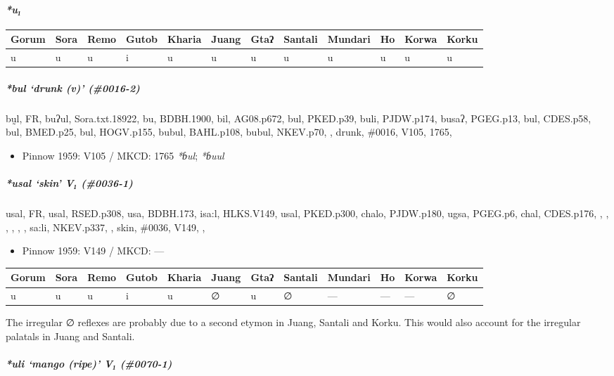\documentclass[a4paper,]{article}
\providecommand{\tightlist}{%
  \setlength{\itemsep}{0pt}\setlength{\parskip}{0pt}}
\let\oldparagraph\paragraph
\renewcommand{\paragraph}[1]{\oldparagraph{#1}\mbox{}}
\let\oldsubparagraph\subparagraph
\renewcommand{\subparagraph}[1]{\oldsubparagraph{#1}\mbox{}}
\begin{document}
\paragraph{\texorpdfstring{\emph{*u₁}}{*u₁}}\label{u}

\begin{longtable}[]{@{}llllllllllll@{}}
\toprule
Gorum & Sora & Remo & Gutob & Kharia & Juang & Gtaʔ & Santali & Mundari
& Ho & Korwa & Korku\tabularnewline
\midrule
\endhead
u & u & u & i & u & u & u & u & u & u & u & u\tabularnewline
\bottomrule
\end{longtable}

\subparagraph{\texorpdfstring{\emph{*bul} `drunk (v)'
(\#0016-2)}{*bul drunk (v) (\#0016-2)}}\label{bul-drunk-v-0016-2}

bṵl, FR, buʔul, Sora.txt.18922, bu, BDBH.1900, bil, AG08.p672, bul,
PKED.p39, buli, PJDW.p174, busaʔ, PGEG.p13, bul, CDES.p58, bul,
BMED.p25, bul, HOGV.p155, bubul, BAHL.p108, bubul, NKEV.p70, , drunk,
\#0016, V105, 1765,

\begin{itemize}
\tightlist
\item
  Pinnow 1959: V105 / MKCD: 1765 \emph{*ɓul}; \emph{*ɓuul}
\end{itemize}

\subparagraph{\texorpdfstring{\emph{*usal} `skin' V₁
(\#0036-1)}{*usal skin V₁ (\#0036-1)}}\label{usal-skin-v-0036-1}

usal, FR, usal, RSED.p308, usa, BDBH.173, isa:l, HLKS.V149, usal,
PKED.p300, chalo, PJDW.p180, ugsa, PGEG.p6, chal, CDES.p176, , , , , , ,
sa:li, NKEV.p337, , skin, \#0036, V149, ,

\begin{itemize}
\tightlist
\item
  Pinnow 1959: V149 / MKCD: ---
\end{itemize}

\begin{longtable}[]{@{}llllllllllll@{}}
\toprule
Gorum & Sora & Remo & Gutob & Kharia & Juang & Gtaʔ & Santali & Mundari
& Ho & Korwa & Korku\tabularnewline
\midrule
\endhead
u & u & u & i & u & ∅ & u & ∅ & --- & --- & --- & ∅\tabularnewline
\bottomrule
\end{longtable}

The irregular ∅ reflexes are probably due to a second etymon in Juang,
Santali and Korku. This would also account for the irregular palatals in
Juang and Santali.

\subparagraph{\texorpdfstring{\emph{*uli} `mango (ripe)' V₁
(\#0070-1)}{*uli mango (ripe) V₁ (\#0070-1)}}\label{uli-mango-ripe-v-0070-1}
\end{document}
